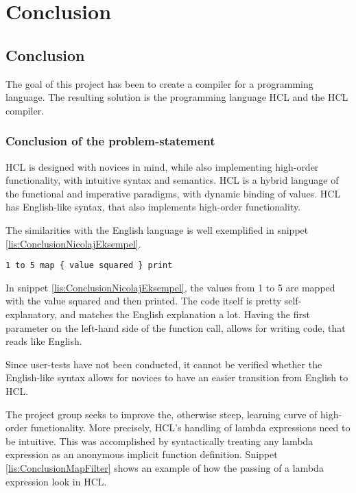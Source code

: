 \chapter{Conclusion}
\section{Conclusion}
The goal of this project has been to create a compiler for a programming language.
The resulting solution is the programming language HCL and the HCL compiler.

\subsection{Conclusion of the problem-statement}
HCL is designed with novices in mind, while also implementing high-order functionality, with intuitive syntax and semantics.
HCL is a hybrid language of the functional and imperative paradigms, with dynamic binding of values.
HCL has English-like syntax, that also implements high-order functionality.

The similarities with the English language is well exemplified in snippet \ref{lis:ConclusionNicolajEksempel}.
\begin{lstlisting}[language=hcl,label=lis:ConclusionNicolajEksempel,caption=English-like syntax example]
1 to 5 map { value squared } print
\end{lstlisting}
In snippet \ref{lis:ConclusionNicolajEksempel}, the values from 1 to 5 are mapped with the value squared and then printed.
The code itself is pretty self-explanatory, and matches the English explanation a lot.
Having the first parameter on the left-hand side of the function call, allows for writing code, that reads like English.

Since user-tests have not been conducted, it cannot be verified whether the English-like syntax allows for novices to have an easier transition from English to HCL.

The project group seeks to improve the, otherwise steep, learning curve of high-order functionality.
More precisely, HCL's handling of lambda expressions need to be intuitive.
This was accomplished by syntactically treating any lambda expression as an anonymous implicit function definition.
Snippet \ref{lis:ConclusionMapFilter} shows an example of how the passing of a lambda expression look in HCL.

